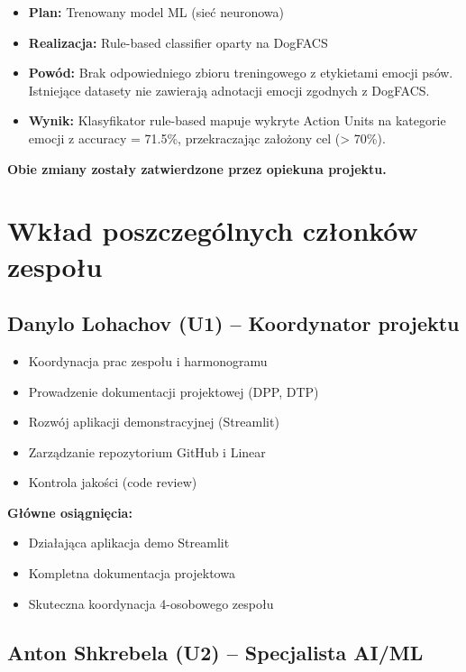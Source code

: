 \documentclass[12pt,a4paper]{article}
\begin{document}
\begin{itemize}
    \item \textbf{Plan:} Trenowany model ML (sieć neuronowa)
    \item \textbf{Realizacja:} Rule-based classifier oparty na DogFACS
    \item \textbf{Powód:} Brak odpowiedniego zbioru treningowego z etykietami emocji psów. Istniejące datasety nie zawierają adnotacji emocji zgodnych z DogFACS.
    \item \textbf{Wynik:} Klasyfikator rule-based mapuje wykryte Action Units na kategorie emocji z accuracy = 71.5\%, przekraczając założony cel (> 70\%).
\end{itemize}

\textbf{Obie zmiany zostały zatwierdzone przez opiekuna projektu.}

\section{Wkład poszczególnych członków zespołu}

\subsection{Danylo Lohachov (U1) -- Koordynator projektu}

\begin{itemize}
    \item Koordynacja prac zespołu i harmonogramu
    \item Prowadzenie dokumentacji projektowej (DPP, DTP)
    \item Rozwój aplikacji demonstracyjnej (Streamlit)
    \item Zarządzanie repozytorium GitHub i Linear
    \item Kontrola jakości (code review)
\end{itemize}

\textbf{Główne osiągnięcia:}
\begin{itemize}
    \item Działająca aplikacja demo Streamlit
    \item Kompletna dokumentacja projektowa
    \item Skuteczna koordynacja 4-osobowego zespołu
\end{itemize}

\subsection{Anton Shkrebela (U2) -- Specjalista AI/ML}
\end{document}
